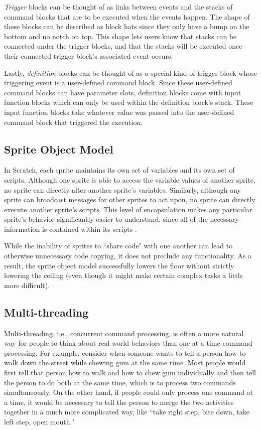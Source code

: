 \emph{Trigger} blocks can be thought of as links between events and the stacks of command blocks that are to be executed when the events happen. The shape of these blocks can be described as block hats since they only have a bump on the bottom and no notch on top. This shape lets users know that stacks can be connected under the trigger blocks, and that the stacks will be executed once their connected trigger block's associated event occurs.

Lastly, \emph{definition} blocks can be thought of as a special kind of trigger block whose triggering event is a user-defined command block. Since these user-defined command blocks can have parameter slots, definition blocks come with input function blocks which can only be used within the definition block's stack. These input function blocks take whatever value was passed into the user-defined command block that triggered the execution.

\subsection{Sprite Object Model}
In Scratch, each sprite maintains its own set of variables and its own set of scripts. Although one sprite is able to access the variable values of another sprite, no sprite can directly alter another sprite's variables. Similarly, although any sprite can broadcast messages for other sprites to act upon, no sprite can directly execute another sprite's scripts. This level of encapsulation makes any particular sprite's behavior significantly easier to understand, since all of the necessary information is contained within its scripts \cite{Maloney}.

While the inability of sprites to ``share code" with one another can lead to otherwise unnecessary code copying, it does not preclude any functionality. As a result, the sprite object model successfully lowers the floor without strictly lowering the ceiling (even though it might make certain complex tasks a little more difficult).

\subsection{Multi-threading}
Multi-threading, i.e., concurrent command processing, is often a more natural way for people to think about real-world behaviors than one at a time command processing. For example, consider when someone wants to tell a person how to walk down the street while chewing gum at the same time. Most people would first tell that person how to walk and how to chew gum individually and then tell the person to do both at the same time, which is to process two commands simultaneously. On the other hand, if people could only process one command at a time, it would be necessary to tell the person to merge the two activities together in a much more complicated way, like ``take right step, bite down, take left step, open mouth."

